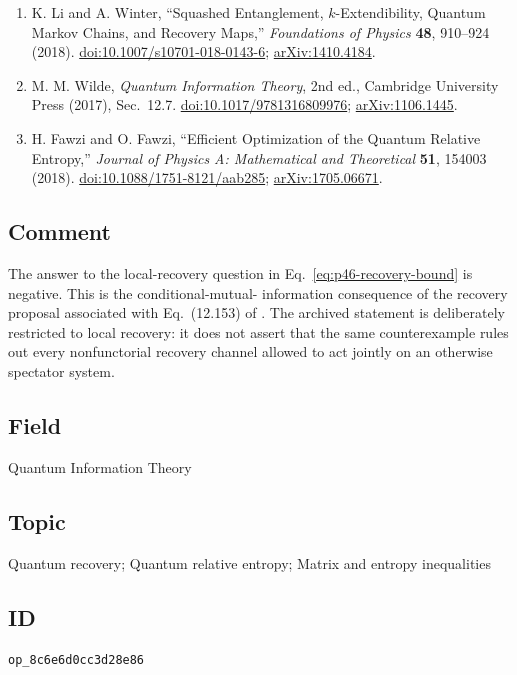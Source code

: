 \begin{enumerate}[label={},leftmargin=4.8em,labelsep=0.5em]
  \footnotesize
  \item[\textup{[LW18]}]\label{ref:p46-li-winter}
  K. Li and A. Winter, ``Squashed Entanglement, $k$-Extendibility, Quantum
  Markov Chains, and Recovery Maps,'' \emph{Foundations of Physics}
  \textbf{48}, 910--924 (2018).
  \href{https://doi.org/10.1007/s10701-018-0143-6}{doi:10.1007/s10701-018-0143-6};
  \href{https://arxiv.org/abs/1410.4184}{arXiv:1410.4184}.

  \item[\textup{[Wil17]}]\label{ref:p46-wilde}
  M. M. Wilde, \emph{Quantum Information Theory}, 2nd ed., Cambridge
  University Press (2017), Sec.~12.7.
  \href{https://doi.org/10.1017/9781316809976}{doi:10.1017/9781316809976};
  \href{https://arxiv.org/abs/1106.1445}{arXiv:1106.1445}.

  \item[\textup{[FF18]}]\label{ref:p46-fawzi}
  H. Fawzi and O. Fawzi, ``Efficient Optimization of the Quantum Relative
  Entropy,'' \emph{Journal of Physics A: Mathematical and Theoretical}
  \textbf{51}, 154003 (2018).
  \href{https://doi.org/10.1088/1751-8121/aab285}{doi:10.1088/1751-8121/aab285};
  \href{https://arxiv.org/abs/1705.06671}{arXiv:1705.06671}.
\end{enumerate}

\subsection*{Comment}

The answer to the local-recovery question in
Eq.~\eqref{eq:p46-recovery-bound} is negative.  This is the conditional-mutual-
information consequence of the recovery proposal associated with
Eq.~(12.153) of .  The archived statement is
deliberately restricted to local recovery: it does not assert that the same
counterexample rules out every nonfunctorial recovery channel allowed to act
jointly on an otherwise spectator system.

\subsection*{Field}

Quantum Information Theory

\subsection*{Topic}

Quantum recovery; Quantum relative entropy; Matrix and entropy inequalities

\subsection*{ID}

\texttt{op\_8c6e6d0cc3d28e86}
